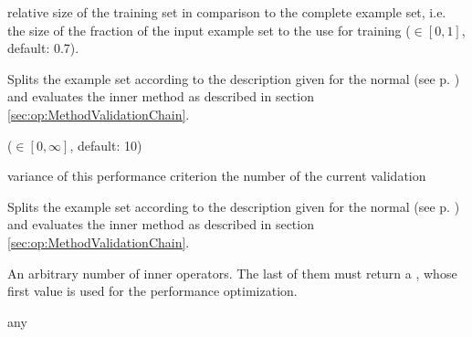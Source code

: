 \methodvalidationdata

\begin{parameters}
 relative size of the training set in comparison to the complete example set, 
i.e. the size of the fraction of the input example set to the use for training ($\in [0,1]$, default: 0.7). 
\end{parameters}

\begin{values}
\methodvalidationchainvalues
\end{values}

\opdescr Splits the example set according to the description given for the
normal  (see
p. \pageref{sec:op:RandomSplitValidationChain}) and evaluates the inner
method as described in section \ref{sec:op:MethodValidationChain}.




\methodvalidationdata

\begin{parameters}
 ($\in [0,\infty]$, default: 10)
\end{parameters}

\begin{values}
\methodvalidationchainvalues
\val[variance] variance of this performance criterion
\val[validation] the number of the current validation
\end{values}

\opdescr Splits the example set according to the description given for the
normal  (see
p. \pageref{sec:op:XValidation}) and evaluates the inner
method as described in section \ref{sec:op:MethodValidationChain}.








\begin{innerops}
\item An arbitrary number of inner operators. The last of them must
  return a , whose first value is used for the performance optimization.
\end{innerops}

\begin{opin}
\item any
\end{opin}

